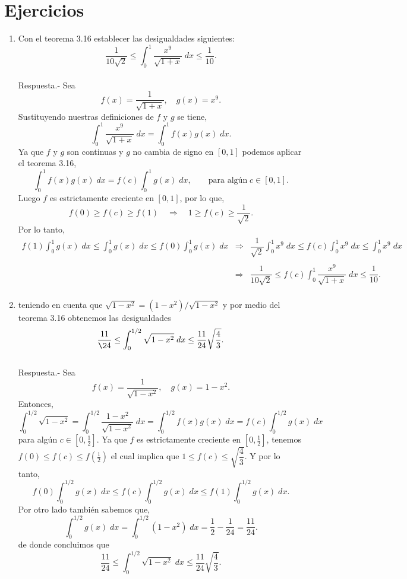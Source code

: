 \section{Ejercicios}

\begin{enumerate}[\bfseries 1.]

    \item Con el teorema 3.16 establecer las desigualdades siguientes:
    $$\dfrac{1}{10\sqrt{2}}\leq \int_0^1 \dfrac{x^9}{\sqrt{1+x}}\; dx \leq \dfrac{1}{10}.$$\\
	Respuesta.-\; Sea $$f(x)=\dfrac{1}{\sqrt{1+x}},\quad g(x)=x^9.$$
	Sustituyendo nuestras definiciones de $f$ y $g$ se tiene,
	$$\int_0^1 \dfrac{x^9}{\sqrt{1+x}}\; dx = \int_0^1 f(x) g(x)\; dx.$$
	Ya que $f$ y $g$ son continuas y $g$ no cambia de signo en $[0,1]$ podemos aplicar el teorema 3.16,
	$$\int_0^1 f(x) g(x)\; dx = f(c)\int_0^1 g(x)\; dx, \qquad \mbox{para algún}\; c\in [0,1].$$
	Luego $f$ es estrictamente creciente en $[0,1]$, por lo que,
	$$f(0)\geq f(c)\geq f(1)\quad \Rightarrow \quad 1\geq f(c)\geq \dfrac{1}{\sqrt{2}}.$$
	Por lo tanto,
	$$\begin{array}{rcl}
	    f(1)\displaystyle\int_0^1 g(x)\; dx \leq \int_0^1 g(x)\; dx \leq f(0)\int_0^1 g(x)\; dx &\Rightarrow & \dfrac{1}{\sqrt{2}}\displaystyle\int_0^1 x^9\; dx \leq f(c)\int_0^1 x^9\; dx \leq \int_0^1 x^9 \; dx \\\\
														    &\Rightarrow & \dfrac{1}{10\sqrt{2}}\leq f(c) \displaystyle\int_0^1 \dfrac{x^9}{\sqrt{1+x}}\; dx\leq \dfrac{1}{10}.\\\
	\end{array}$$

    \item teniendo en cuenta que $\sqrt{1-x^2} = (1-x^2)/\sqrt{1-x^2}$ y por medio del teorema 3.16 obtenemos las desigualdades
    $$\dfrac{11}{\24}\leq \int_0^{1/2}\sqrt{1-x^2}\; dx \leq \dfrac{11}{24}\sqrt{\dfrac{4}{3}}.$$\\
    Respuesta.-\; Sea $$f(x)=\dfrac{1}{\sqrt{1-x^2}},\quad g(x)=1-x^2.$$ 
    Entonces,
    $$\int_0^{1/2}\sqrt{1-x^2}=\int_0^{1/2}\dfrac{1-x^2}{\sqrt{1-x^2}}\; dx = \int_0^{1/2}f(x)g(x)\; dx = f(c)\int_0^{1/2}g(x)\; dx$$
    para algún $c\in [0,\frac{1}{2}]$. Ya que $f$ es estrictamente creciente en $[0,\frac{1}{2}]$, tenemos $f(0)\leq f(c)\leq f(\frac{1}{2})$ el cual implica que $1\leq f(c)\leq \sqrt{\dfrac{4}{3}}$. Y por lo tanto,
    $$f(0)\int_0^{1/2}g(x)\; dx \leq f(c) \int_0^{1/2}g(x)\; dx \leq f(1)\int_0^{1/2}g(x)\; dx.$$
    Por otro lado también sabemos que,
    $$\int_0^{1/2}g(x)\; dx = \int_0^{1/2}(1-x^2)\; dx=\dfrac{1}{2}-\dfrac{1}{24}=\dfrac{11}{24}.$$
    de donde concluimos que 
    $$\dfrac{11}{24}\leq \int_0^{1/2}\sqrt{1-x^2}\; dx \leq \dfrac{11}{24}\sqrt{\dfrac{4}{3}}.$$\\


\end{enumerate}
